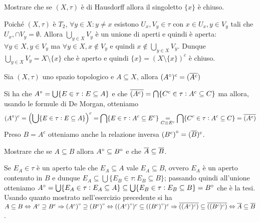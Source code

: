 \begin{es}
  Mostrare che se $ (X, \tau) $ è di Hausdorff allora il singoletto $ \{x\} $ è chiuso.
\end{es}
%
Poiché $ (X, \tau) $ è $ T_2 $, $ \forall y \in X : y \neq x $ esistono $ U_x, V_y \in \tau $ con $ x \in U_x, y \in V_y $ tali che $ U_x, \cap V_y = \emptyset $. Allora $ \bigcup_{y \in X} V_y $ è un unione di aperti e quindi è aperta: $ \forall y \in X, y \in V_y $ ma $ \forall y \in X, x \notin V_y $ e quindi $ x \notin \bigcup_{y \in X} V_y $. Dunque $ \bigcup_{y \in X} V_y = X \setminus \{x\} $ che è aperto e quindi $ \{x\} = (X \setminus \{x\})^c $ è chiuso.

\begin{es}
  Sia $ (X, \tau) $ uno spazio topologico e $ A \subseteq X $, allora $ ({A}^{\circ})^c = (\overline{A^c}) $
\end{es}
%
Si ha che $ {A}^{\circ} = \bigcup \{E \in \tau : E \subseteq A\} $ e che $ \overline{(A^c)} = \bigcap \{C^c \in \tau : A^c \subseteq C\} $ ma allora, usando le formule di De Morgan, otteniamo
\[({A}^{\circ})^c = \left(\bigcup \{E \in \tau : E \subseteq A\}\right)^c = \bigcap \{E \in \tau : A^c \subseteq E^c\} \underset{C \equiv E^c}{=} \bigcap \{C^c \in \tau : A^c \subseteq C\} = \overline{(A^c)}\]
Preso $ B = A^c $ otteniamo anche la relazione inversa $ {(B^c)}^{\circ} = (\overline{B})^c $.

\begin{es}
  Mostrare che se $ A \subseteq B $ allora $ {A}^{\circ} \subseteq {B}^{\circ} $ e che $ \overline{A} \subseteq \overline{B} $.
\end{es}
%
Se $ E_A \in \tau $ è un aperto tale che $ E_A \subseteq A $ vale $ E_A \subseteq B $, ovvero $ E_A $ è un aperto contenuto in $ B $ e dunque $ E_A \subseteq \bigcup \{E_B \in \tau : E_B \subseteq B\} $; passando quindi all'unione otteniamo  $ {A}^{\circ} = \bigcup \{E_A \in \tau : E_A \subseteq A\} \subseteq  \bigcup \{E_B \in \tau : E_B \subseteq B\} = {B}^{\circ} $ che è la tesi. \\
Usando quanto mostrato nell'esercizio precedente si ha $ A \subseteq B \Leftrightarrow A^c \supseteq B^c \Rightarrow {(A^c)}^{\circ} \supseteq {(B^c)}^{\circ} \Leftrightarrow ({(A^c)}^{\circ})^c \subseteq ({(B^c)}^{\circ})^c \Rightarrow \overline{((A^c)^c)} \subseteq \overline{((B^c)^c)} \Leftrightarrow \overline{A} \subseteq \overline{B} $.

